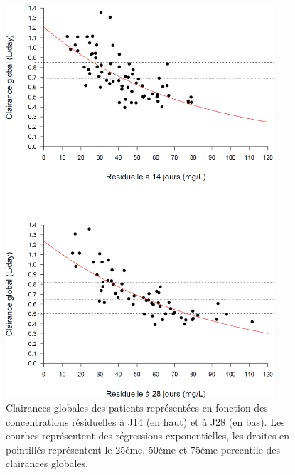 \begin{figure}[htbp]
	\centering
		\includegraphics[width=10cm]{figures/raster/FIG_30}
	\caption{Clairances globales des patients représentées en fonction des concentrations résiduelles à J14 (en haut) et à J28 (en bas). Les courbes représentent des régressions exponentielles, les droites en pointillés représentent le 25éme, 50éme et 75éme percentile des clairances globales.}
	\label{fig:30}
\end{figure}
